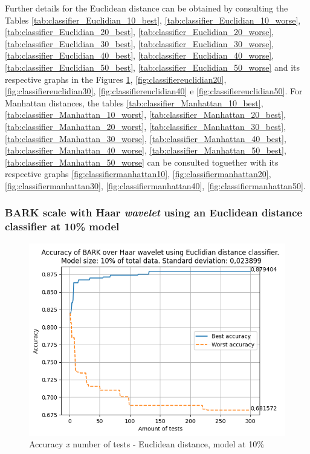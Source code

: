 		\par Further details for the Euclidean distance can be obtained by consulting the Tables \ref{tab:classifier_Euclidian_10_best}, \ref{tab:classifier_Euclidian_10_worse},
		\ref{tab:classifier_Euclidian_20_best}, \ref{tab:classifier_Euclidian_20_worse}, 
		\ref{tab:classifier_Euclidian_30_best}, \ref{tab:classifier_Euclidian_30_worse}, 
		\ref{tab:classifier_Euclidian_40_best}, \ref{tab:classifier_Euclidian_40_worse}, 
		\ref{tab:classifier_Euclidian_50_best}, \ref{tab:classifier_Euclidian_50_worse}
		and its respective graphs in the Figures \ref{fig:classifiereuclidian10}, \ref{fig:classifiereuclidian20}, \ref{fig:classifiereuclidian30}, \ref{fig:classifiereuclidian40} e \ref{fig:classifiereuclidian50}. For Manhattan distances, the tables \ref{tab:classifier_Manhattan_10_best}, \ref{tab:classifier_Manhattan_10_worst}, 
		\ref{tab:classifier_Manhattan_20_best}, \ref{tab:classifier_Manhattan_20_worst}, 
		\ref{tab:classifier_Manhattan_30_best}, \ref{tab:classifier_Manhattan_30_worse}, 
		\ref{tab:classifier_Manhattan_40_best}, \ref{tab:classifier_Manhattan_40_worse}, 
		\ref{tab:classifier_Manhattan_50_best}, \ref{tab:classifier_Manhattan_50_worse} 
		can be consulted toguether with its respective graphs \ref{fig:classifiermanhattan10}, \ref{fig:classifiermanhattan20}, \ref{fig:classifiermanhattan30}, \ref{fig:classifiermanhattan40}, \ref{fig:classifiermanhattan50}.\\
		
		

		\subsubsection{BARK scale with Haar \textit{wavelet} using an Euclidean distance classifier at 10\% model}
				
			\begin{figure}[H]
				\centering
				\includegraphics[scale=.6]{images/results/confusionMatrices/classifier_Euclidian_10}
				\caption{Accuracy \textit{x} number of tests - Euclidean distance, model at 10\%}
				\label{fig:classifiereuclidian10}
			\end{figure}

